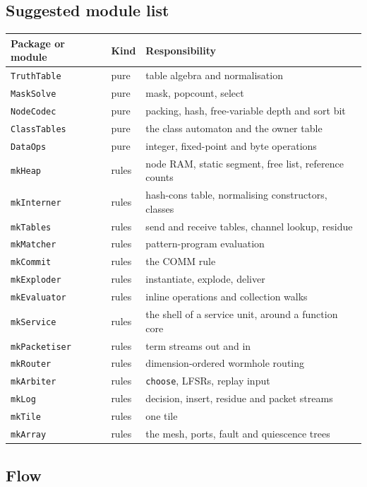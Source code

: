 \documentclass[10.5pt,a4paper]{extarticle}
\newcommand{\kw}[1]{\texttt{#1}}
\theoremstyle{definition}
\theoremstyle{remark}
\begin{document}
\subsection{Suggested module list}

\noindent
\begin{tabularx}{\textwidth}{@{}l l X@{}}
\toprule
Package or module & Kind & Responsibility\\
\midrule
\kw{TruthTable}   & pure & table algebra and normalisation\\
\kw{MaskSolve}    & pure & mask, popcount, select\\
\kw{NodeCodec}    & pure & packing, hash, free-variable depth and sort bit\\
\kw{ClassTables}  & pure & the class automaton and the owner table\\
\kw{DataOps}      & pure & integer, fixed-point and byte operations\\
\kw{mkHeap}       & rules & node RAM, static segment, free list, reference counts\\
\kw{mkInterner}   & rules & hash-cons table, normalising constructors, classes\\
\kw{mkTables}     & rules & send and receive tables, channel lookup, residue\\
\kw{mkMatcher}    & rules & pattern-program evaluation\\
\kw{mkCommit}     & rules & the COMM rule\\
\kw{mkExploder}   & rules & instantiate, explode, deliver\\
\kw{mkEvaluator}  & rules & inline operations and collection walks\\
\kw{mkService}    & rules & the shell of a service unit, around a function core\\
\kw{mkPacketiser} & rules & term streams out and in\\
\kw{mkRouter}     & rules & dimension-ordered wormhole routing\\
\kw{mkArbiter}    & rules & \kw{choose}, LFSRs, replay input\\
\kw{mkLog}        & rules & decision, insert, residue and packet streams\\
\kw{mkTile}       & rules & one tile\\
\kw{mkArray}      & rules & the mesh, ports, fault and quiescence trees\\
\bottomrule
\end{tabularx}

\subsection{Flow}
\end{document}

